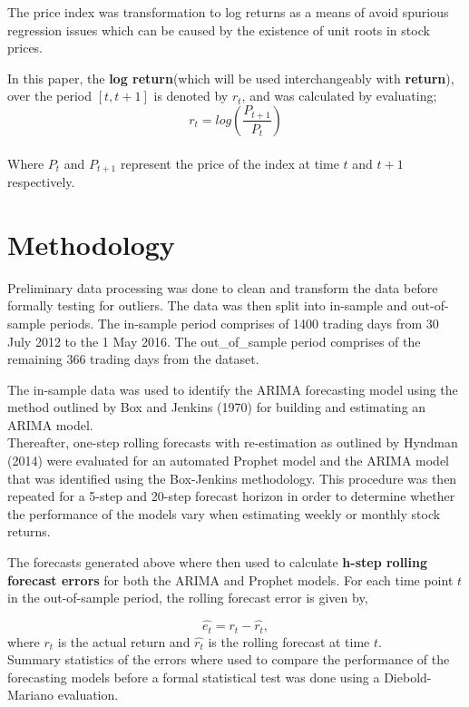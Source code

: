 \documentclass[12pt,a4paper]{article}
\numberwithin{equation}{section}
\numberwithin{figure}{section}
\numberwithin{table}{section}
\begin{document}
The price index was transformation to log returns as a means of avoid
spurious regression issues which can be caused by the existence of unit
roots in stock prices.

In this paper, the \textbf{log return}(which will be used
interchangeably with \textbf{return}), over the period \([t,t+1]\) is
denoted by \(r_t\), and was calculated by evaluating;\\
\[
r_t = log(\frac{P_{t+1}}{P_t})  \label{eq1}
\]\\
Where \(P_t\) and \(P_{t+1}\) represent the price of the index at time
\(t\) and \(t+1\) respectively.

\section{Methodology}\label{methodology}

Preliminary data processing was done to clean and transform the data
before formally testing for outliers. The data was then split into
in-sample and out-of-sample periods. The in-sample period comprises of
1400 trading days from 30 July 2012 to the 1 May 2016. The
out\_of\_sample period comprises of the remaining 366 trading days from
the dataset.

The in-sample data was used to identify the ARIMA forecasting model
using the method outlined by Box and Jenkins (1970) for building and
estimating an ARIMA model.\\
Thereafter, one-step rolling forecasts with re-estimation as outlined by
Hyndman (2014) were evaluated for an automated Prophet model and the
ARIMA model that was identified using the Box-Jenkins methodology. This
procedure was then repeated for a 5-step and 20-step forecast horizon in
order to determine whether the performance of the models vary when
estimating weekly or monthly stock returns.

The forecasts generated above where then used to calculate
\textbf{h-step rolling forecast errors} for both the ARIMA and Prophet
models. For each time point \(t\) in the out-of-sample period, the
rolling forecast error is given by,

\[ \hat{e_t} = r_t - \hat{r_t},\] where \(r_t\) is the actual return and
\(\hat{r_t}\) is the rolling forecast at time \(t\).\\
Summary statistics of the errors where used to compare the performance
of the forecasting models before a formal statistical test was done
using a Diebold-Mariano evaluation.
\end{document}
